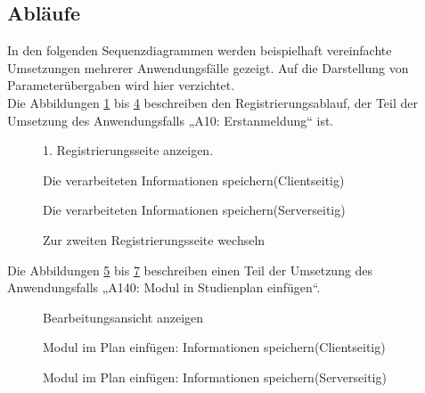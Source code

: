 \subsection{Abläufe}

In den folgenden Sequenzdiagrammen werden beispielhaft vereinfachte Umsetzungen mehrerer Anwendungsfälle gezeigt. Auf die Darstellung von Parameterübergaben wird hier verzichtet.\\

Die Abbildungen \ref{seq:register_1} bis \ref{seq:register_4} beschreiben den Registrierungsablauf, der Teil der Umsetzung des Anwendungsfalls „A10: Erstanmeldung“ ist.

\begin{figure}[H]
	
	\caption{1. Registrierungsseite anzeigen.}
	\label{seq:register_1}
\end{figure}

\begin{figure}[H]
	
	\caption{Die verarbeiteten Informationen speichern(Clientseitig)}
	\label{seq:register_2}
\end{figure}

\begin{figure}[H]
	
	\caption{Die verarbeiteten Informationen speichern(Serverseitig)}
	\label{seq:register_3}
\end{figure}

\begin{figure}[H]
	
	\caption{Zur zweiten Registrierungsseite wechseln}
	\label{seq:register_4}
\end{figure}

Die Abbildungen \ref{seq:addmodul_1} bis \ref{seq:addmodul_3} beschreiben einen Teil der Umsetzung des Anwendungsfalls „A140: Modul in Studienplan einfügen“.

\begin{figure}[H]
	
	\caption{Bearbeitungsansicht anzeigen}
	\label{seq:addmodul_1}
\end{figure}

\begin{figure}[H]
	
	\caption{Modul im Plan einfügen: Informationen speichern(Clientseitig)}
	\label{seq:addmodul_2}
\end{figure}

\begin{figure}[H]
	
	\caption{Modul im Plan einfügen: Informationen speichern(Serverseitig)}
	\label{seq:addmodul_3}
\end{figure}

